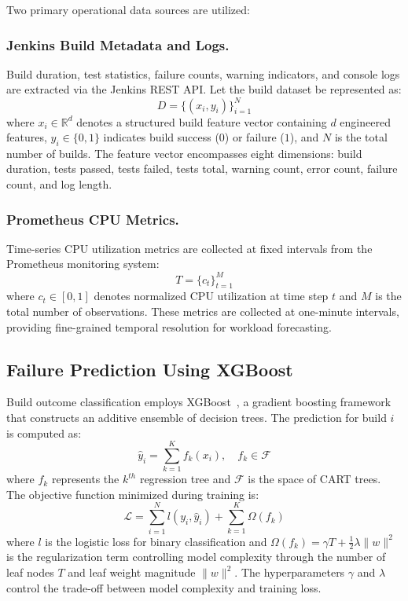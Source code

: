 \documentclass[sn-nature]{sn-jnl}
\theoremstyle{thmstyleone}
\theoremstyle{thmstyletwo}
\theoremstyle{thmstylethree}
\begin{document}
Two primary operational data sources are utilized:

\subsubsection{Jenkins Build Metadata and Logs.}
Build duration, test statistics, failure counts, warning indicators, and console logs are extracted via the Jenkins REST API. Let the build dataset be represented as:
\begin{equation}
D = \{(x_i, y_i)\}_{i=1}^{N}
\end{equation}
where $x_i \in \mathbb{R}^d$ denotes a structured build feature vector containing $d$ engineered features, $y_i \in \{0,1\}$ indicates build success ($0$) or failure ($1$), and $N$ is the total number of builds. The feature vector encompasses eight dimensions: build duration, tests passed, tests failed, tests total, warning count, error count, failure count, and log length.

\subsubsection{Prometheus CPU Metrics.}
Time-series CPU utilization metrics are collected at fixed intervals from the Prometheus monitoring system:
\begin{equation}
T = \{c_t\}_{t=1}^{M}
\end{equation}
where $c_t \in [0, 1]$ denotes normalized CPU utilization at time step $t$ and $M$ is the total number of observations. These metrics are collected at one-minute intervals, providing fine-grained temporal resolution for workload forecasting.

\subsection{Failure Prediction Using XGBoost}\label{subsec:failurepred}

Build outcome classification employs XGBoost~\cite{chen2016xgboost}, a gradient boosting framework that constructs an additive ensemble of decision trees. The prediction for build $i$ is computed as:
\begin{equation}
\hat{y}_i = \sum_{k=1}^{K} f_k(x_i), \quad f_k \in \mathcal{F}
\end{equation}
where $f_k$ represents the $k^{th}$ regression tree and $\mathcal{F}$ is the space of CART trees. The objective function minimized during training is:
\begin{equation}\label{eq:xgboost_obj}
\mathcal{L} = \sum_{i=1}^{N} l(y_i, \hat{y}_i) + \sum_{k=1}^{K} \Omega(f_k)
\end{equation}
where $l$ is the logistic loss for binary classification and $\Omega(f_k) = \gamma T + \frac{1}{2}\lambda \|w\|^2$ is the regularization term controlling model complexity through the number of leaf nodes $T$ and leaf weight magnitude $\|w\|^2$. The hyperparameters $\gamma$ and $\lambda$ control the trade-off between model complexity and training loss.
\end{document}
